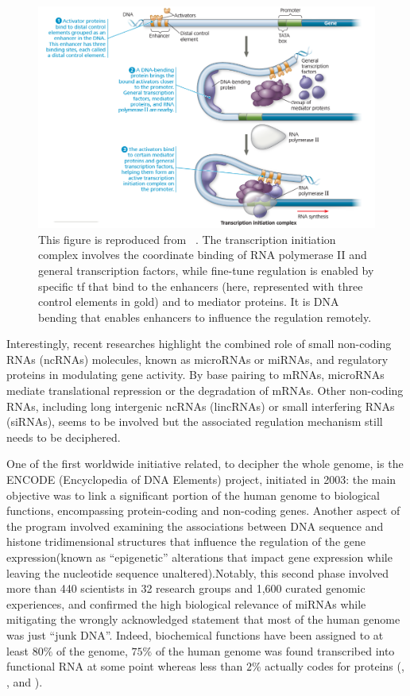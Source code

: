 \begin{figure}
    \centering
    \includegraphics{figures/model-enhancer.png}
    \caption[\textbf{Model for the coordinate action of RNA polymerase and \acrshort{tf}.}]{This figure is reproduced from ~\autocite[Fig.~18.11, p.~375]{campbell_etal20}. The transcription initiation complex involves the coordinate binding of RNA polymerase II and general transcription factors, while fine-tune regulation is enabled by specific \acrshort{tf} that bind to the enhancers (here, represented with three control elements in gold) and to mediator proteins. It is DNA bending that enables enhancers to influence the regulation remotely. }
    \label{fig:model-enhancer}
\end{figure}


Interestingly, recent researches highlight the combined role of small non-coding RNAs (ncRNAs) molecules, known as microRNAs or miRNAs, and regulatory proteins in modulating gene activity. By base pairing to mRNAs, microRNAs mediate translational repression or the degradation of mRNAs. Other non-coding RNAs, including long intergenic ncRNAs (lincRNAs) or small interfering RNAs (siRNAs), seems to be involved but the associated regulation mechanism still needs to be deciphered. 

One of the first worldwide initiative related, to decipher the whole genome, is the ENCODE (Encyclopedia of DNA Elements) project, initiated in 2003: the main objective was to link a significant portion of the human genome to biological functions, encompassing protein-coding and non-coding genes. Another aspect of the program involved examining the associations between DNA sequence and histone tridimensional structures that influence the regulation of the gene expression(known as \enquote{epigenetic} alterations that impact gene expression while leaving the nucleotide sequence unaltered).Notably, this second phase involved more than 440 scientists in 32 research groups and 1,600 curated genomic experiences, and confirmed the high biological relevance of miRNAs while mitigating the wrongly acknowledged statement that most of the human genome was just \enquote{junk DNA}. Indeed, biochemical functions have been assigned to at least $80\%$ of the genome, $75\%$ of the human genome was found transcribed into functional RNA at some point whereas less than $2\%$ actually codes for proteins (\autocite{desouza12}, \autocite{ecker_etal12}, \autocite{gerstein_etal07} and \autocite{snyder_etal20}).


